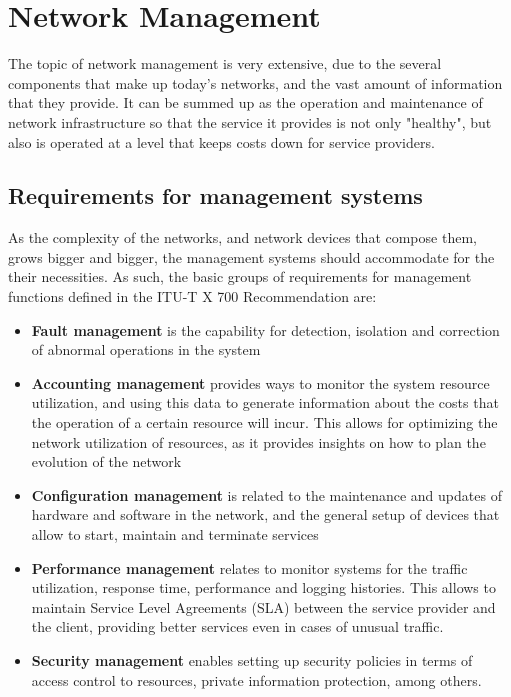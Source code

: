 \section{Network Management} \label{chap:nm} 

\par The topic of network management is very extensive, due to the several components that make up today's networks, and the vast amount of information that they
provide. It can be summed up as the operation and maintenance of network infrastructure so that the service it provides is not only "healthy", but also is operated
at a level that keeps costs down for service providers. 

\subsection {Requirements for management systems}

\par As the complexity of the networks, and network devices that compose them, grows bigger and bigger, the management systems should accommodate for the their
necessities. As such, the basic groups of requirements for management functions  defined in the ITU-T X 700 Recommendation \cite{noauthor_recommendation_1992}
are:

\begin {itemize}
    \item \textbf {Fault management} is the capability for detection, isolation and correction of abnormal operations in the system
    \item \textbf {Accounting management} provides ways to monitor the system resource utilization, and using this data to generate information about the costs that
        the operation of a certain resource will incur. This allows for optimizing the network utilization of resources, as it provides insights on how to
        plan the evolution of the network
    \item \textbf {Configuration management} is related to the maintenance and updates of hardware and software in the network, and the general setup of devices 
        that allow to start, maintain and terminate services 
    \item \textbf {Performance management} relates to monitor systems for the traffic utilization, response time, performance and logging histories. This allows to 
        maintain Service Level Agreements (SLA) between the service provider and the client, providing better services even in cases of unusual traffic.
    \item \textbf {Security management} enables setting up security policies in terms of access control to resources, private information protection, among others.
\end {itemize}

